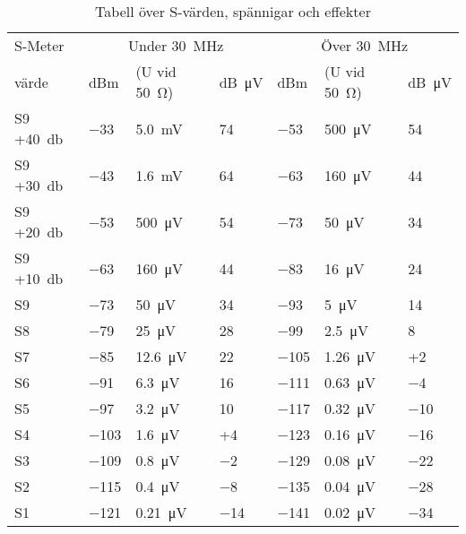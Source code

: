 \begin{table}[h!]
  \vspace{10ex}
	\centering
	\begin{tabular}{l|lll|lll}
    S-Meter  & \multicolumn{3}{c}{Under \SI{30}{\mega\hertz}} & \multicolumn{3}{c}{Över \SI{30}{\mega\hertz}} \\
    värde    & dBm & (U vid \SI{50}{\ohm}) & \si{dB\micro V} & dBm & (U vid \SI{50}{\ohm}) & \si{dB\micro V} \\
    \hline
    S9 +\SI{40}{\decibel} & \num{-33}  & \SI{5,0}{\milli\volt}  & 74        & \num{-53}  & \SI{500}{\micro\volt}  & 54  \\
    S9 +\SI{30}{\decibel} & \num{-43}  & \SI{1,6}{\milli\volt}  & 64        & \num{-63}  & \SI{160}{\micro\volt}  & 44  \\
    S9 +\SI{20}{\decibel} & \num{-53}  & \SI{500}{\micro\volt}  & 54        & \num{-73}  & \SI{50}{\micro\volt}   & 34  \\
    S9 +\SI{10}{\decibel} & \num{-63}  & \SI{160}{\micro\volt}  & 44        & \num{-83}  & \SI{16}{\micro\volt}   & 24  \\
    S9                    & \num{-73}  & \SI{50}{\micro\volt}   & 34        & \num{-93}  & \SI{5}{\micro\volt}    & 14  \\
    S8                    & \num{-79}  & \SI{25}{\micro\volt}   & 28        & \num{-99}  & \SI{2,5}{\micro\volt}  & 8   \\
    S7                    & \num{-85}  & \SI{12,6}{\micro\volt} & 22        & \num{-105} & \SI{1,26}{\micro\volt} & +2  \\
    S6                    & \num{-91}  & \SI{6,3}{\micro\volt}  & 16        & \num{-111} & \SI{0,63}{\micro\volt} & \num{-4}  \\
    S5                    & \num{-97}  & \SI{3,2}{\micro\volt}  & 10        & \num{-117} & \SI{0,32}{\micro\volt} & \num{-10} \\
    S4                    & \num{-103} & \SI{1,6}{\micro\volt}  & +4        & \num{-123} & \SI{0,16}{\micro\volt} & \num{-16} \\
    S3                    & \num{-109} & \SI{0,8}{\micro\volt}  & \num{-2}  & \num{-129} & \SI{0,08}{\micro\volt} & \num{-22} \\
    S2                    & \num{-115} & \SI{0,4}{\micro\volt}  & \num{-8}  & \num{-135} & \SI{0,04}{\micro\volt} & \num{-28} \\
    S1                    & \num{-121} & \SI{0,21}{\micro\volt} & \num{-14} & \num{-141} & \SI{0,02}{\micro\volt} & \num{-34} \\
  \end{tabular}
  \caption{Tabell över S-värden, spännigar och effekter}
\end{table}

